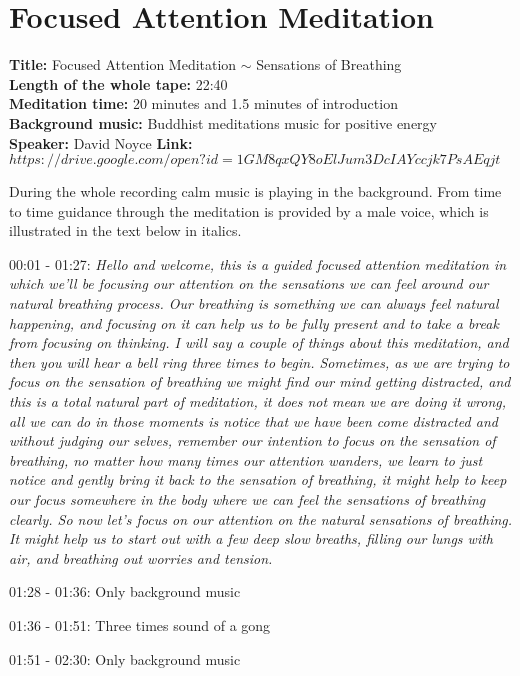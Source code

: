 \chapter{Focused Attention Meditation} \label{FAM}
\textbf{Title:} Focused Attention Meditation $\sim$  Sensations of Breathing  \\
\textbf{Length of the whole tape:} 22:40 \\
\textbf{Meditation time:} 20 minutes and 1.5 minutes of introduction \\
\textbf{Background music:} Buddhist meditations music for positive energy  \\
\textbf{Speaker:} David Noyce 
\textbf{Link:} $https://drive.google.com/open?id=1GM8qxQY8oElJum3DcIAYccjk7PsAEqjt$

During the whole recording calm music is playing in the background. From time to time guidance through the meditation is provided by a male voice, which is illustrated in the text below in italics. 

00:01 - 01:27: \textit{Hello and welcome, this is a guided focused attention meditation in which we'll be focusing our attention on the sensations we can feel around our natural breathing process. Our breathing is something we can always feel natural happening, and focusing on it can help us to be fully present and to take a break from focusing on thinking. I will say a couple of things about this meditation, and then you will hear a bell ring three times to begin. Sometimes, as we are trying to focus on the sensation of breathing we might find our mind getting distracted, and this is a total natural part of meditation, it does not mean we are doing it wrong, all we can do in those moments is notice that we have been come distracted and without judging our selves, remember our intention to focus on the sensation of breathing, no matter how many times our attention wanders, we learn to just notice and gently bring it back to the sensation of breathing, it might help to keep our focus somewhere in the body where we can feel the sensations of breathing clearly. So now let's focus on our attention on the natural sensations of breathing. It might help us to start out with a few deep slow breaths, filling our lungs with air, and breathing out worries and tension.}

01:28 - 01:36: Only background music 

01:36 - 01:51: Three times sound of a gong 

01:51 - 02:30: Only background music

